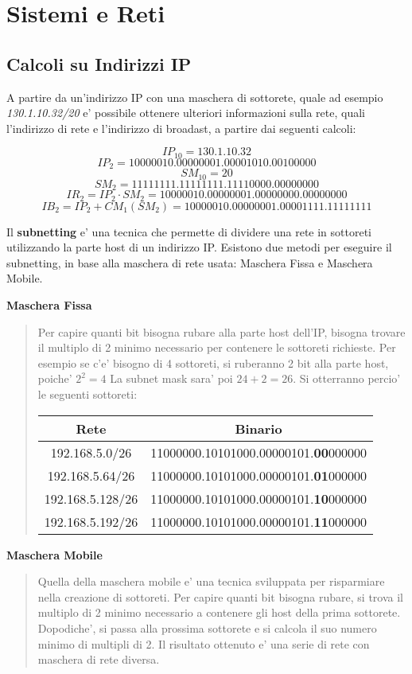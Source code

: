 \documentclass{article}
\begin{document}
  \section{Sistemi e Reti}
  {
    \subsection{Calcoli su Indirizzi IP}
    A partire da un'indirizzo IP con una maschera di sottorete, quale ad esempio \textit{130.1.10.32/20} e' possibile ottenere ulteriori informazioni sulla rete, quali l'indirizzo di rete e l'indirizzo di broadast, a partire dai seguenti calcoli:

    $$ IP_{10} = 130.1.10.32 $$ 
    $$ IP_{2} = 10000010.00000001.00001010.00100000 $$
    $$ SM_{10} = 20 $$
    $$ SM_{2} = 11111111.11111111.11110000.00000000 $$
    $$ IR_{2} = IP_{2} \cdot SM_{2} = 10000010.00000001.00000000.00000000 $$
    $$ IB_{2} = IP_{2} + CM_{1}(SM_{2}) = 10000010.00000001.00001111.11111111 $$

    Il \textbf{subnetting} e' una tecnica che permette di dividere una rete in sottoreti utilizzando la parte host di un indirizzo IP. Esistono due metodi per eseguire il subnetting, in base alla maschera di rete usata: Maschera Fissa e Maschera Mobile.

    \textbf{Maschera Fissa}
    \begin{quote}
      Per capire quanti bit bisogna rubare alla parte host dell'IP, bisogna trovare il multiplo di 2 minimo necessario per contenere le sottoreti richieste. Per esempio se c'e' bisogno di 4 sottoreti, si ruberanno 2 bit alla parte host, poiche' $ 2^2 = 4 $ La subnet mask sara' poi $ 24 + 2 = 26 $. Si otterranno percio' le seguenti sottoreti:

      \begin{tabular}{ |c|c| }
        \hline
        Rete & Binario \\
        \hline
        192.168.5.0/26 & 11000000.10101000.00000101.\textbf{00}000000 \\
        192.168.5.64/26 & 11000000.10101000.00000101.\textbf{01}000000 \\
        192.168.5.128/26 & 11000000.10101000.00000101.\textbf{10}000000 \\
        192.168.5.192/26 & 11000000.10101000.00000101.\textbf{11}000000 \\
        \hline
      \end{tabular}
    \end{quote}

    \textbf{Maschera Mobile}
    \begin{quote}
      Quella della maschera mobile e' una tecnica sviluppata per risparmiare nella creazione di sottoreti. Per capire quanti bit bisogna rubare, si trova il multiplo di 2 minimo necessario a contenere gli host della prima sottorete. Dopodiche', si passa alla prossima sottorete e si calcola il suo numero minimo di multipli di 2. Il risultato ottenuto e' una serie di rete con maschera di rete diversa.
    \end{quote}
  }
\end{document}
